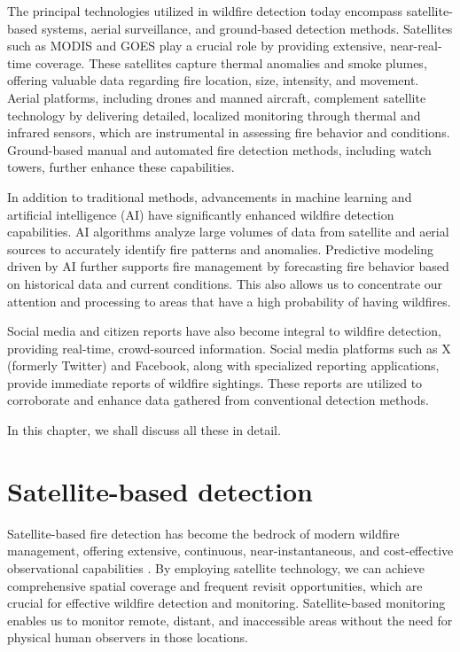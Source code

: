 \documentclass[
  12 pt,
]{Nemilov}
\begin{document}
The principal technologies utilized in wildfire detection today encompass satellite-based systems, aerial surveillance, and ground-based detection methods. Satellites such as MODIS and GOES play a crucial role by providing extensive, near-real-time coverage. These satellites capture thermal anomalies and smoke plumes, offering valuable data regarding fire location, size, intensity, and movement. Aerial platforms, including drones and manned aircraft, complement satellite technology by delivering detailed, localized monitoring through thermal and infrared sensors, which are instrumental in assessing fire behavior and conditions. Ground-based manual and automated fire detection methods, including watch towers, further enhance these capabilities.

In addition to traditional methods, advancements in machine learning and artificial intelligence (AI) have significantly enhanced wildfire detection capabilities. AI algorithms analyze large volumes of data from satellite and aerial sources to accurately identify fire patterns and anomalies. Predictive modeling driven by AI further supports fire management by forecasting fire behavior based on historical data and current conditions. This also allows us to concentrate our attention and processing to areas that have a high probability of having wildfires.

Social media and citizen reports have also become integral to wildfire detection, providing real-time, crowd-sourced information. Social media platforms such as X (formerly Twitter) and Facebook, along with specialized reporting applications, provide immediate reports of wildfire sightings. These reports are utilized to corroborate and enhance data gathered from conventional detection methods.

In this chapter, we shall discuss all these in detail.

\section{Satellite-based detection}\label{satellite-based-detection}

Satellite-based fire detection has become the bedrock of modern wildfire management, offering extensive, continuous, near-instantaneous, and cost-effective observational capabilities \citep{chuvieco2020satellite, wooster2021satellite}. By employing satellite technology, we can achieve comprehensive spatial coverage and frequent revisit opportunities, which are crucial for effective wildfire detection and monitoring. Satellite-based monitoring enables us to monitor remote, distant, and inaccessible areas without the need for physical human observers in those locations.
\end{document}
